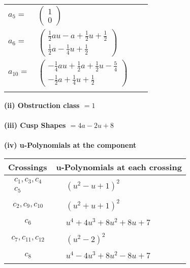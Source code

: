 \documentclass[1p]{elsarticle_modified}
\theoremstyle{definition}
\begin{document}
\begin{tabular}{m{7pt} m{180pt} m{7pt} m{180pt} }
\flushright $a_{5}=$&$\begin{pmatrix}1\\0\end{pmatrix}$ \\
\flushright $a_{6}=$&$\begin{pmatrix}\frac{1}{2} a u- a+\frac{1}{2} u+\frac{1}{2}\\\frac{1}{2} a-\frac{1}{4} u+\frac{1}{2}\end{pmatrix}$ \\
\flushright $a_{10}=$&$\begin{pmatrix}-\frac{1}{4} a u+\frac{1}{2} a+\frac{1}{2} u-\frac{5}{4}\\-\frac{1}{2} a+\frac{1}{4} u+\frac{1}{2}\end{pmatrix}$\\&\end{tabular}
\flushleft \textbf{(ii) Obstruction class $= 1$}\\~\\
\flushleft \textbf{(iii) Cusp Shapes $= 4 a-2 u+8$}\\~\\
\newpage\renewcommand{\arraystretch}{1}
\flushleft \textbf{(iv) u-Polynomials at the component}\newline \\
\begin{tabular}{m{50pt}|m{274pt}}
Crossings & \hspace{64pt}u-Polynomials at each crossing \\
\hline $$\begin{aligned}c_{1},c_{3},c_{4}\\c_{5}\end{aligned}$$&$\begin{aligned}
&(u^2- u+1)^2
\end{aligned}$\\
\hline $$\begin{aligned}c_{2},c_{9},c_{10}\end{aligned}$$&$\begin{aligned}
&(u^2+u+1)^2
\end{aligned}$\\
\hline $$\begin{aligned}c_{6}\end{aligned}$$&$\begin{aligned}
&u^4+4 u^3+8 u^2+8 u+7
\end{aligned}$\\
\hline $$\begin{aligned}c_{7},c_{11},c_{12}\end{aligned}$$&$\begin{aligned}
&(u^2-2)^2
\end{aligned}$\\
\hline $$\begin{aligned}c_{8}\end{aligned}$$&$\begin{aligned}
&u^4-4 u^3+8 u^2-8 u+7
\end{aligned}$\\
\hline
\end{tabular}\\~\\
\end{document}
